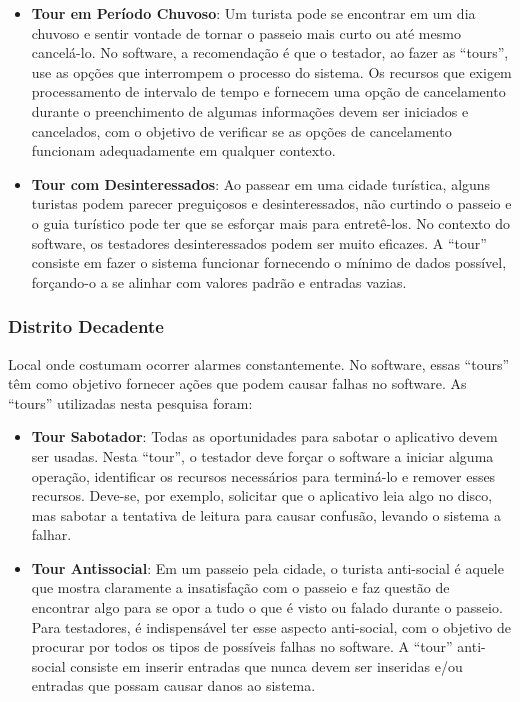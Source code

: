 \begin{itemize}
    \item \textbf{Tour em Período Chuvoso}: Um turista pode se encontrar em um dia chuvoso e sentir vontade de tornar o passeio mais curto ou até mesmo cancelá-lo. No software, a recomendação é que o testador, ao fazer as ``tours'', use as opções que interrompem o processo do sistema. Os recursos que exigem processamento de intervalo de tempo e fornecem uma opção de cancelamento durante o preenchimento de algumas informações devem ser iniciados e cancelados, com o objetivo de verificar se as opções de cancelamento funcionam adequadamente em qualquer contexto.
    
    \item \textbf{Tour com Desinteressados}: Ao passear em uma cidade turística, alguns turistas podem parecer preguiçosos e desinteressados, não curtindo o passeio e o guia turístico pode ter que se esforçar mais para entretê-los. No contexto do software, os testadores desinteressados podem ser muito eficazes. A ``tour'' consiste em fazer o sistema funcionar fornecendo o mínimo de dados possível, forçando-o a se alinhar com valores padrão e entradas vazias.
\end{itemize}

\subsubsection{Distrito Decadente} 

Local onde costumam ocorrer alarmes constantemente. No software, essas ``tours'' têm como objetivo fornecer ações que podem causar falhas no software. As ``tours'' utilizadas nesta pesquisa foram:

\begin {itemize}
    \item \textbf {Tour Sabotador}: Todas as oportunidades para sabotar o aplicativo devem ser usadas. Nesta ``tour'', o testador deve forçar o software a iniciar alguma operação, identificar os recursos necessários para terminá-lo e remover esses recursos. Deve-se, por exemplo, solicitar que o aplicativo leia algo no disco, mas sabotar a tentativa de leitura para causar confusão, levando o sistema a falhar.
    \item \textbf {Tour Antissocial}: Em um passeio pela cidade, o turista anti-social é aquele que mostra claramente a insatisfação com o passeio e faz questão de encontrar algo para se opor a tudo o que é visto ou falado durante o passeio. Para testadores, é indispensável ter esse aspecto anti-social, com o objetivo de procurar por todos os tipos de possíveis falhas no software. A ``tour'' anti-social consiste em inserir entradas que nunca devem ser inseridas e/ou entradas que possam causar danos ao sistema.
\end {itemize}

